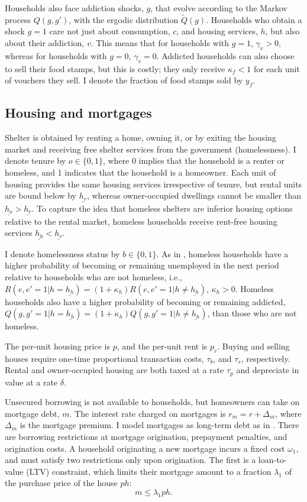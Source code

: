 \documentclass[parskip=full]{article}
\begin{document}
Households also face addiction shocks, $g$, that evolve according to the Markov process $Q(g,g')$, with the ergodic distribution $\tilde{Q}(g)$. Households who obtain a shock $g=1$ care not just about consumption, $c$, and housing services, $h$, but also about their addiction, $v$. This means that for households with $g=1$, $\gamma_{v}>0$, whereas for households with $g=0$, $\gamma_{v}=0$. Addicted households can also choose to sell their food stamps, but this is costly; they only receive $\kappa_{f}<1$ for each unit of vouchers they sell. I denote the fraction of food stamps sold by $y_{f}$.

\subsection{Housing and mortgages}
Shelter is obtained by renting a home, owning it, or by exiting the housing market and receiving free shelter services from the government (homelessness). I denote tenure by $o\in\{0,1\}$, where 0 implies that the household is a renter or homeless, and 1 indicates that the household is a homeowner. Each unit of housing provides the same housing services irrespective of tenure, but rental units are bound below by $\underline{{h}_r}$, whereas owner-occupied dwellings cannot be smaller than $\underline{{h}_o}>\underline{{h}_r}$. To capture the idea that homeless shelters are inferior housing options relative to the rental market, homeless households receive rent-free housing services $\underline{{h}_h}<\underline{{h}_r}$. 

I denote homelessness status by $b \in \{0,1\}$. As in \citet{az-2024}, homeless households have a higher probability of becoming or remaining unemployed in the next period relative to households who are not homeless, i.e., $R(e,e'=1|h=\underline{{h}_h})=(1+\kappa_{h})R(e,e'=1|h \neq \underline{{h}_h})$, $\kappa_{h}>0$. Homeless households also have a higher probability of becoming or remaining addicted, $Q(g,g'=1|h=\underline{{h}_h})=(1+\kappa_{h})Q(g,g'=1|h \neq \underline{{h}_h})$, than those who are not homeless.

The per-unit housing price is $p$, and the per-unit rent is $p_{r}$. Buying and selling houses require one-time proportional transaction costs, $\tau_{b}$, and $\tau_{s}$, respectively. Rental and owner-occupied housing are both taxed at a rate $\tau_{p}$ and depreciate in value at a rate $\delta$.

Unsecured borrowing is not available to households, but homeowners can take on mortgage debt, $m$. The interest rate charged on mortgages is $r_m =r+\Delta_m$, where $\Delta_m$ is the mortgage premium. I model mortgages as long-term debt as in \citet{kkk-2021}. There are borrowing restrictions at mortgage origination, prepayment penalties, and origination costs. A household originating a new mortgage incurs a fixed cost $\omega_1$, and must satisfy two restrictions only upon origination. The first is a loan-to-value (LTV) constraint, which limits their mortgage amount to a fraction $\lambda_{1}$ of the purchase price of the house $ph$:
\begin{equation}
\label{eq:ltv}
m \leq \lambda_{1} ph.
\end{equation}
\end{document}
